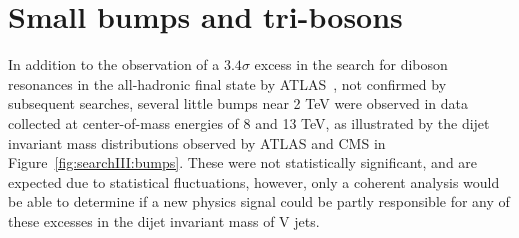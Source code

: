 \newcommand{\MassExclWPr}{3.7\xspace} %
\newcommand{\MassExclZPr}{3.5\xspace}
\newcommand{\MassExclVPr}{V.V\xspace}
\newcommand{\BulkGMassMin}{1.2\xspace} %
\newcommand{\BulkGMassMinXsec}{9\xspace} %
\newcommand{\BulkGMassMax}{5.2\xspace}
\newcommand{\BulkGMassMaxXsec}{0.2\xspace} %
\newcommand{\BulkGWWMassMinXsec}{9\xspace} %
\newcommand{\BulkGWWMassMaxXsec}{0.2\xspace}
\newcommand{\BulkGZZMassMinXsec}{13\xspace} %
\newcommand{\BulkGZZMassMaxXsec}{0.2\xspace}
\section{Small bumps and tri-bosons}
In addition to the observation of a $3.4 \sigma$ excess in the search for diboson resonances in the all-hadronic final state by ATLAS~\cite{Aad2015}, not confirmed by subsequent searches, several little bumps near 2 TeV were observed in data collected at center-of-mass energies of 8 and 13 TeV, as illustrated by the dijet invariant mass distributions observed by ATLAS and CMS in Figure~\ref{fig:searchIII:bumps}. These were not statistically significant, and are expected due to statistical fluctuations, however, only a coherent analysis would be able to determine if a new physics signal could be partly responsible for any of these excesses in the dijet invariant mass of V jets.
